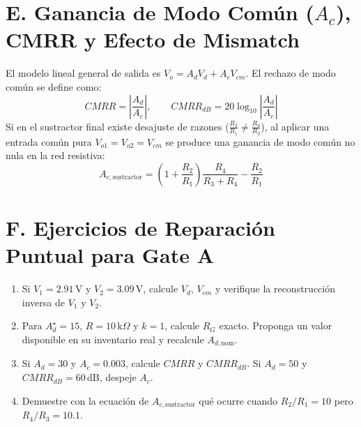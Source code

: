 \documentclass[11pt, a4paper]{article}
\begin{document}
\section*{E. Ganancia de Modo Común ($A_c$), CMRR y Efecto de Mismatch}
El modelo lineal general de salida es $V_o = A_d V_d + A_c V_{cm}$. El rechazo de modo común se define como:
\begin{equation}
    \boxed{CMRR = \left|\frac{A_d}{A_c}\right|}, \qquad \boxed{CMRR_{dB} = 20\log_{10}\left|\frac{A_d}{A_c}\right|}
\end{equation}
Si en el sustractor final existe desajuste de razones ($\frac{R_2}{R_1} \neq \frac{R_4}{R_3}$), al aplicar una entrada común pura $V_{o1} = V_{o2} = V_{cm}$ se produce una ganancia de modo común no nula en la red resistiva:
\begin{equation}
    \boxed{A_{c,\mathrm{sustractor}} = \left(1 + \frac{R_2}{R_1}\right)\frac{R_4}{R_3 + R_4} - \frac{R_2}{R_1}}
\end{equation}

\section*{F. Ejercicios de Reparación Puntual para Gate A}
\begin{enumerate}
    \setlength{\itemsep}{1pt}
    \item Si $V_1 = 2.91\,\text{V}$ y $V_2 = 3.09\,\text{V}$, calcule $V_d$, $V_{cm}$ y verifique la reconstrucción inversa de $V_1$ y $V_2$.
    \item Para $A_d^\star = 15$, $R = 10\,\text{k}\Omega$ y $k = 1$, calcule $R_G$ exacto. Proponga un valor disponible en su inventario real y recalcule $A_{d,\mathrm{nom}}$.
    \item Si $A_d = 30$ y $A_c = 0.003$, calcule $CMRR$ y $CMRR_{dB}$. Si $A_d = 50$ y $CMRR_{dB} = 60\,\text{dB}$, despeje $A_c$.
    \item Demuestre con la ecuación de $A_{c,\mathrm{sustractor}}$ qué ocurre cuando $R_2/R_1 = 10$ pero $R_4/R_3 = 10.1$.
\end{enumerate}
\end{document}
